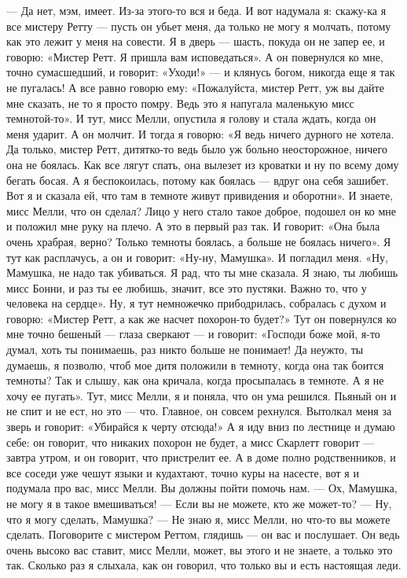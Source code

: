 — Да нет, мэм, имеет. Из-за этого-то вся и беда. И вот надумала я: скажу-ка я все мистеру Ретту — пусть он убьет меня, да только не могу я молчать, потому как это лежит у меня на совести. Я в дверь — шасть, покуда он не запер ее, и говорю: «Мистер Ретт. Я пришла вам исповедаться». А он повернулся ко мне, точно сумасшедший, и говорит: «Уходи!» — и клянусь богом, никогда еще я так не пугалась! А все равно говорю ему: «Пожалуйста, мистер Ретт, уж вы дайте мне сказать, не то я просто помру. Ведь это я напугала маленькую мисс темнотой-то». И тут, мисс Мелли, опустила я голову и стала ждать, когда он меня ударит. А он молчит. И тогда я говорю: «Я ведь ничего дурного не хотела. Да только, мистер Ретт, дитятко-то ведь было уж больно неосторожное, ничего она не боялась. Как все лягут спать, она вылезет из кроватки и ну по всему дому бегать босая. А я беспокоилась, потому как боялась — вдруг она себя зашибет. Вот я и сказала ей, что там в темноте живут привидения и оборотни».
И знаете, мисс Мелли, что он сделал? Лицо у него стало такое доброе, подошел он ко мне и положил мне руку на плечо. А это в первый раз так. И говорит: «Она была очень храбрая, верно? Только темноты боялась, а больше не боялась ничего». Я тут как расплачусь, а он и говорит: «Ну-ну, Мамушка». И погладил меня. «Ну, Мамушка, не надо так убиваться. Я рад, что ты мне сказала. Я знаю, ты любишь мисс Бонни, и раз ты ее любишь, значит, все это пустяки. Важно то, что у человека на сердце». Ну, я тут немножечко прибодрилась, собралась с духом и говорю: «Мистер Ретт, а как же насчет похорон-то будет?» Тут он повернулся ко мне точно бешеный — глаза сверкают — и говорит: «Господи боже мой, я-то думал, хоть ты понимаешь, раз никто больше не понимает! Да неужто, ты думаешь, я позволю, чтоб мое дитя положили в темноту, когда она так боится темноты? Так и слышу, как она кричала, когда просыпалась в темноте. А я не хочу ее пугать». Тут, мисс Мелли, я и поняла, что он ума решился. Пьяный он и не спит и не ест, но это — что. Главное, он совсем рехнулся. Вытолкал меня за зверь и говорит: «Убирайся к черту отсюда!» А я иду вниз по лестнице и думаю себе: он говорит, что никаких похорон не будет, а мисс Скарлетт говорит — завтра утром, и он говорит, что пристрелит ее. А в доме полно родственников, и все соседи уже чешут языки и кудахтают, точно куры на насесте, вот я и подумала про вас, мисс Мелли. Вы должны пойти помочь нам.
— Ох, Мамушка, не могу я в такое вмешиваться!
— Если вы не можете, кто же может-то?
— Ну, что я могу сделать, Мамушка?
— Не знаю я, мисс Мелли, но что-то вы можете сделать. Поговорите с мистером Реттом, глядишь — он вас и послушает. Он ведь очень высоко вас ставит, мисс Мелли, может, вы этого и не знаете, а только это так. Сколько раз я слыхала, как он говорил, что только вы и есть настоящая леди.
